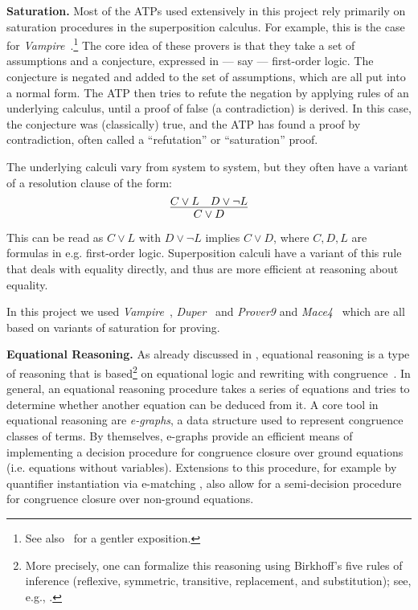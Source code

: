\textbf{Saturation.}
Most of the ATPs used extensively in this project rely primarily on saturation procedures in the superposition calculus.
For example, this is the case for \emph{Vampire}~\cite{DBLP:conf/cav/KovacsV13}.\footnote{See also~\cite{DBLP:journals/cacm/BentkampBNTVW23} for a gentler exposition.}
The core idea of these provers is that they take a set of assumptions and a conjecture, expressed in --- say --- first-order logic.
The conjecture is negated and added to the set of assumptions, which are all put into a normal form.
The ATP then tries to refute the negation by applying rules of an underlying calculus, until a proof of false (a contradiction) is derived.
In this case, the conjecture was (classically) true, and the ATP has found a proof by contradiction, often called a ``refutation'' or ``saturation'' proof.

The underlying calculi vary from system to system, but they often have a variant of a resolution clause of the form:
\[\infer{C \lor D}{C \lor L \quad D \lor \neg L} \]
This can be read as $C \lor L$ with $D \lor \neg L$ implies $C \lor D$, where $C, D, L$ are formulas in e.g. first-order logic.
Superposition calculi have a variant of this rule that deals with equality directly, and thus are more efficient at reasoning about equality.

In this project we used \emph{Vampire}~\cite{DBLP:conf/cav/KovacsV13}, \emph{Duper}~\cite{DBLP:conf/itp/CluneQBA24} and \emph{Prover9} and \emph{Mace4}~\cite{prover9-mace4} which are all based on variants of saturation for proving.

\textbf{Equational Reasoning.} As already discussed in , equational reasoning is a type of reasoning that is based\footnote{More precisely, one can formalize this reasoning using Birkhoff's five rules of inference (reflexive, symmetric, transitive, replacement, and substitution); see, e.g., \cite{burris}.} on equational logic and rewriting with congruence~\cite{term-rewriting}.
In general, an equational reasoning procedure takes a series of equations and tries to determine whether another equation can be deduced from it.
A core tool in equational reasoning are \emph{e-graphs}, a data structure used to represent congruence classes of terms.
By themselves, e-graphs provide an efficient means of implementing a decision procedure for congruence closure over ground equations (i.e. equations without variables).
Extensions to this procedure, for example by quantifier instantiation via e-matching \cite{DBLP:conf/cade/MouraB07}, also allow for a semi-decision procedure for congruence closure over non-ground equations.

